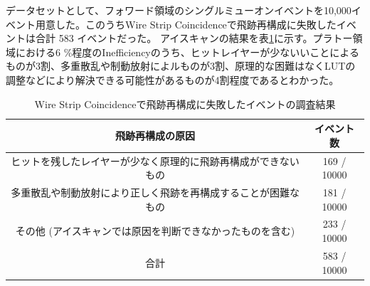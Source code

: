 データセットとして、フォワード領域のシングルミューオンイベントを10,000イベント用意した。このうちWire Strip Coincidenceで飛跡再構成に失敗したイベントは合計 583 イベントだった。
アイスキャンの結果を表\ref{tab:eyscan}に示す。プラトー領域における6 \%程度のInefficiencyのうち、ヒットレイヤーが少ないいことによるものが3割、多重散乱や制動放射によルものが3割、原理的な困難はなくLUTの調整などにより解決できる可能性があるものが4割程度であるとわかった。

\begin{table}[]
  \centering
  \caption{Wire Strip Coincidenceで飛跡再構成に失敗したイベントの調査結果}
  \label{tab:eyscan}
  \begin{tabular}{|c|c|}
  \hline
  飛跡再構成の原因                        & イベント数       \\ \hline\hline
  ヒットを残したレイヤーが少なく原理的に飛跡再構成ができないもの & 169 / 10000 \\ \hline
  多重散乱や制動放射により正しく飛跡を再構成することが困難なもの & 181 / 10000 \\ \hline
  その他 (アイスキャンでは原因を判断できなかったものを含む)  & 233 / 10000 \\ \hline
  合計                              & 583 / 10000 \\ \hline
  \end{tabular}
\end{table}



